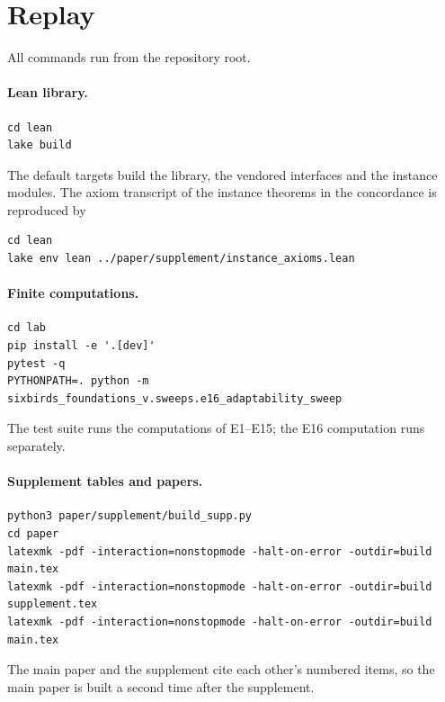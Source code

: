 \section{Replay}
\label{supp:replay}

All commands run from the repository root.

\paragraph{Lean library.}
\begin{verbatim}
cd lean
lake build
\end{verbatim}
The default targets build the library, the vendored interfaces and the instance modules. The axiom
transcript of the instance theorems in the concordance is reproduced by
\begin{verbatim}
cd lean
lake env lean ../paper/supplement/instance_axioms.lean
\end{verbatim}

\paragraph{Finite computations.}
\begin{verbatim}
cd lab
pip install -e '.[dev]'
pytest -q
PYTHONPATH=. python -m sixbirds_foundations_v.sweeps.e16_adaptability_sweep
\end{verbatim}
The test suite runs the computations of E1--E15; the E16 computation runs separately.

\paragraph{Supplement tables and papers.}
\begin{verbatim}
python3 paper/supplement/build_supp.py
cd paper
latexmk -pdf -interaction=nonstopmode -halt-on-error -outdir=build main.tex
latexmk -pdf -interaction=nonstopmode -halt-on-error -outdir=build supplement.tex
latexmk -pdf -interaction=nonstopmode -halt-on-error -outdir=build main.tex
\end{verbatim}
The main paper and the supplement cite each other's numbered items, so the main paper is built a
second time after the supplement.
